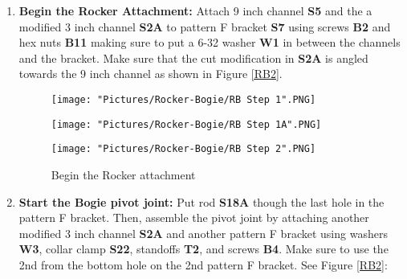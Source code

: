 \documentclass[12pt]{article}
\begin{document}
\begin{enumerate}
\item \textbf{Begin the Rocker Attachment:}  Attach 9 inch channel \textbf{S5} and the a modified 3 inch channel \textbf{S2A} to pattern F bracket \textbf{S7} using screws \textbf{B2} and hex nuts \textbf{B11} making sure to put a 6-32 washer \textbf{W1} in between the channels and the bracket. Make sure that the cut modification in \textbf{S2A} is angled towards the 9 inch channel as shown in Figure \ref {RB2}. 

\begin{figure}[H]
  	\centering
  	\begin{minipage}[b]{0.30\textwidth}
    		\texttt{[image: "Pictures/Rocker-Bogie/RB Step 1".PNG]}
  	\end{minipage}
  	\hfill
  	\begin{minipage}[b]{0.30\textwidth}
    		\texttt{[image: "Pictures/Rocker-Bogie/RB Step 1A".PNG]}
  	\end{minipage}
    	\hfill
  	\begin{minipage}[b]{0.30\textwidth}
    		\texttt{[image: "Pictures/Rocker-Bogie/RB Step 2".PNG]}
  	\end{minipage}
  	\caption{Begin the Rocker attachment}
\end{figure}



\item \textbf{Start the Bogie pivot joint:} Put rod \textbf{S18A} though the last hole in the pattern F bracket. Then,  assemble the pivot joint by attaching another modified 3 inch channel \textbf{S2A} and another pattern F bracket using washers \textbf{W3}, collar clamp \textbf{S22}, standoffs \textbf{T2}, and screws \textbf{B4}. Make sure to use the 2nd from the bottom hole on the 2nd pattern F bracket. See Figure \ref{RB2}:



\end{enumerate}
\end{document}
